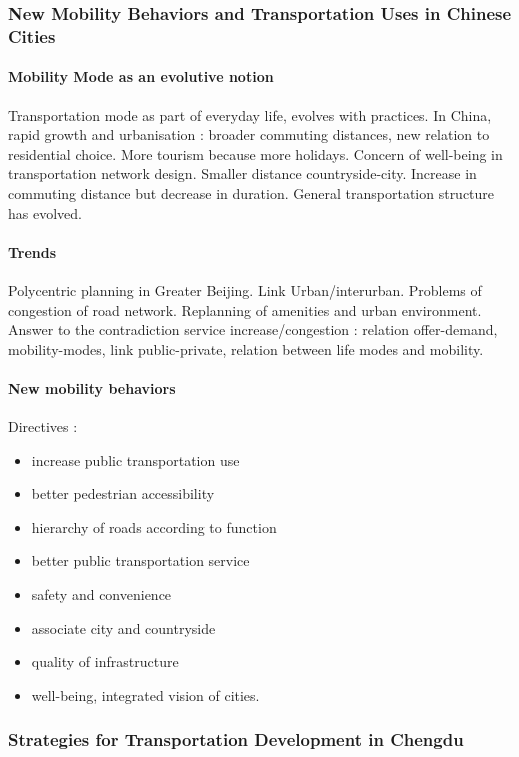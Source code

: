 \subsubsection{New Mobility Behaviors and Transportation Uses in Chinese Cities}

\paragraph{Mobility Mode as an evolutive notion}

Transportation mode as part of everyday life, evolves with practices. In China, rapid growth and urbanisation : broader commuting distances, new relation to residential choice. More tourism because more holidays. Concern of well-being in transportation network design. Smaller distance countryside-city. Increase in commuting distance but decrease in duration. General transportation structure has evolved.

\paragraph{Trends}

Polycentric planning in Greater Beijing. Link Urban/interurban. Problems of congestion of road network. Replanning of amenities and urban environment. Answer to the contradiction service increase/congestion : relation offer-demand, mobility-modes, link public-private, relation between life modes and mobility.

\paragraph{New mobility behaviors}

Directives :
\begin{itemize}
\item increase public transportation use
\item better pedestrian accessibility
\item hierarchy of roads according to function
\item better public transportation service
\item safety and convenience
\item associate city and countryside
\item quality of infrastructure
\item well-being, integrated vision of cities.
\end{itemize}

\subsubsection{Strategies for Transportation Development in Chengdu}

